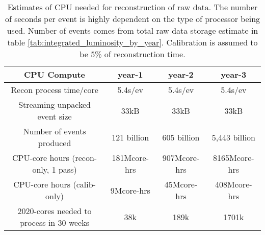 \begin{table*}[htb!]
    \centering
    \begin{tabular}{c|c|c|c}
        \hline
        CPU Compute & year-1 & year-2 & year-3 \\
        \hline
        \hline
        Recon process time/core	& 5.4s/ev	& 5.4s/ev	& 5.4s/ev \\
        \hline
        Streaming-unpacked event size	& 33kB	& 33kB & 33kB \\
        \hline
        Number of events produced &	121 billion	& 605 billion & 5,443 billion \\
        \hline
        CPU-core hours (recon-only, 1 pass)	& 181Mcore-hrs	& 907Mcore-hrs &	8165Mcore-hrs \\
        \hline
        CPU-core hours (calib-only) &	9Mcore-hrs &	45Mcore-hrs &	408Mcore-hrs \\	
        \hline
        2020-cores needed to process in 30 weeks	& 38k &	189k &	1701k \\
        \hline
    \end{tabular}
    \caption{Estimates of CPU needed for reconstruction of raw data. The number of seconds per event is highly dependent on the type of processor being used. Number of events comes from total raw data storage estimate in table \ref{tab:integrated_luminosity_by_year}. Calibration is assumed to be 5\% of reconstruction time.}
    \label{tab:cpu_summary}
\end{table*}



